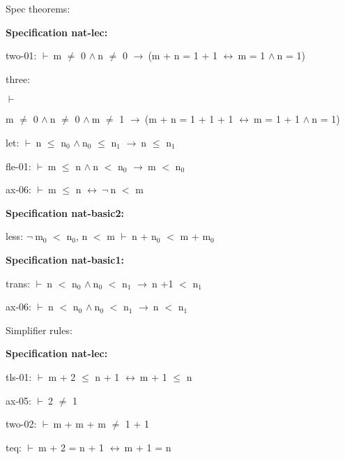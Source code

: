 \documentclass[a4paper]{article}
\newcommand{\Fol}{\mbox{$\vdash\ $}}
\newcommand{\Not}{\mbox{$\neg\ $}}
\newcommand{\And}{\mbox{$\wedge\ $}}
\newcommand{\Imp}{\mbox{$\rightarrow\ $}}
\newcommand{\Equiv}{\mbox{$\leftrightarrow\ $}}
\begin{document}
\raggedright
              
Spec theorems: 


{\bf Specification nat-lec:}

two-01: 
 \Fol m $\neq$ 0 \And n $\neq$ 0 \Imp (m + n = 1 + 1 \Equiv m = 1 \And n = 1)



three: 
\begin{flushleft}


\Fol

m $\neq$ 0 \And n $\neq$ 0 \And m $\neq$ 1 \Imp (m + n = 1 + 1 + 1 \Equiv m = 1 + 1 \And n = 1)

\end{flushleft}



let: 
 \Fol n $\le$ $\mbox{n}_{0}$ \And $\mbox{n}_{0}$ $\le$ $\mbox{n}_{1}$ \Imp n $\le$ $\mbox{n}_{1}$



fle-01: 
 \Fol m $\le$ n \And n $<$ $\mbox{n}_{0}$ \Imp m $<$ $\mbox{n}_{0}$



ax-06: 
 \Fol m $\le$ n \Equiv \Not n $<$ m



{\bf Specification nat-basic2:}

less: 
\Not $\mbox{m}_{0}$ $<$ $\mbox{n}_{0}$, 
n $<$ m
 \Fol n + $\mbox{n}_{0}$ $<$ m + $\mbox{m}_{0}$



{\bf Specification nat-basic1:}

trans: 
 \Fol n $<$ $\mbox{n}_{0}$ \And $\mbox{n}_{0}$ $<$ $\mbox{n}_{1}$ \Imp n +1 $<$ $\mbox{n}_{1}$



ax-06: 
 \Fol n $<$ $\mbox{n}_{0}$ \And $\mbox{n}_{0}$ $<$ $\mbox{n}_{1}$ \Imp n $<$ $\mbox{n}_{1}$






Simplifier rules: 


{\bf Specification nat-lec:}

tls-01: 
 \Fol m + 2 $\le$ n + 1 \Equiv m + 1 $\le$ n



ax-05: 
 \Fol 2 $\neq$ 1



two-02: 
 \Fol m + m + m $\neq$ 1 + 1



teq: 
 \Fol m + 2 = n + 1 \Equiv m + 1 = n
\end{document}
